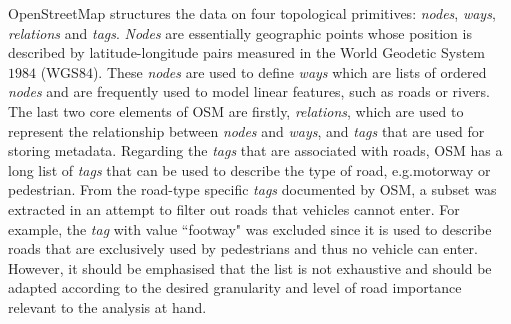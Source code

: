 \documentclass[12pt]{article}
\theoremstyle{definition}
\begin{document}
OpenStreetMap structures the data on four topological primitives: \textit{nodes}, \textit{ways}, \textit{relations} and \textit{tags}. \textit{Nodes} are essentially geographic points whose position is described by latitude-longitude pairs measured in the World Geodetic System $1984$ (WGS$84$). These \textit{nodes} are used to define \textit{ways} which are lists of ordered \textit{nodes} and are frequently used to model linear features, such as roads or rivers. The last two core elements of OSM are firstly, \textit{relations}, which are used to represent the relationship between \textit{nodes} and \textit{ways}, and \textit{tags} that are used for storing metadata. Regarding the \textit{tags} that are associated with roads, OSM has a long list of \textit{tags} that can be used to describe the type of road, e.g.\texttildelow motorway or pedestrian. From the road-type specific \textit{tags} documented by OSM, a subset was extracted in an attempt to filter out roads that vehicles cannot enter. For example, the \textit{tag} with value ``footway" was excluded since it is used to describe roads that are exclusively used by pedestrians and thus no vehicle can enter. However, it should be emphasised that the list is not exhaustive and should be adapted according to the desired granularity and level of road importance relevant to the analysis at hand.
\end{document}
